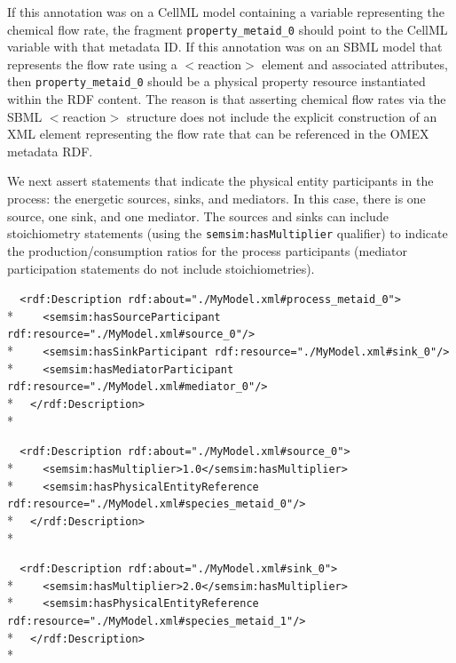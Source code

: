 \documentclass[pdftex,rgb,dvipsnames,svgnames,hyperref,table]{report}
\begin{document}
If this annotation was on a CellML model containing a variable representing the chemical flow rate, the fragment \texttt{property\_metaid\_0} should point to the CellML variable with that metadata ID. If this annotation was on an SBML model that represents the flow rate using a $<$reaction$>$ element and associated attributes, then \texttt{property\_metaid\_0} should be a physical property resource instantiated within the RDF content. The reason is that asserting chemical flow rates via the SBML $<$reaction$>$ structure does not include the explicit construction of an XML element representing the flow rate that can be referenced in the OMEX metadata RDF.

We next assert statements that indicate the physical entity participants in the process: the energetic sources, sinks, and mediators. In this case, there is one source, one sink, and one mediator. The sources and sinks can include stoichiometry statements (using the \texttt{semsim:hasMultiplier} qualifier) to indicate the production/consumption ratios for the process participants (mediator participation statements do not include stoichiometries).

\verb|  <rdf:Description rdf:about="./MyModel.xml#process_metaid_0">|\\*
\verb|    <semsim:hasSourceParticipant rdf:resource="./MyModel.xml#source_0"/>|\\*
\verb|    <semsim:hasSinkParticipant rdf:resource="./MyModel.xml#sink_0"/>|\\*
\verb|    <semsim:hasMediatorParticipant rdf:resource="./MyModel.xml#mediator_0"/>|\\*
\verb|  </rdf:Description>|\\*


\verb|  <rdf:Description rdf:about="./MyModel.xml#source_0">|\\*
\verb|    <semsim:hasMultiplier>1.0</semsim:hasMultiplier>|\\*
\verb|    <semsim:hasPhysicalEntityReference rdf:resource="./MyModel.xml#species_metaid_0"/>|\\*
\verb|  </rdf:Description>|\\*


\verb|  <rdf:Description rdf:about="./MyModel.xml#sink_0">|\\*
\verb|    <semsim:hasMultiplier>2.0</semsim:hasMultiplier>|\\*
\verb|    <semsim:hasPhysicalEntityReference rdf:resource="./MyModel.xml#species_metaid_1"/>|\\*
\verb|  </rdf:Description>|\\*
  
\end{document}
